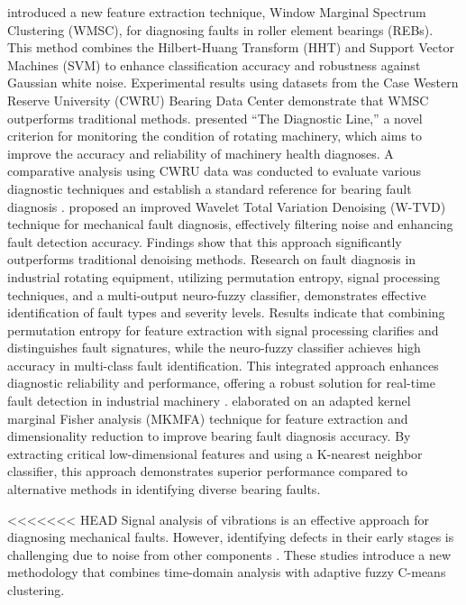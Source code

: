 \documentclass[sn-basic,pdflatex]{sn-jnl}
\theoremstyle{remark}
\theoremstyle{definition}
\begin{document}
\citet{WOS:000365686400021} introduced a new feature extraction
technique, Window Marginal Spectrum Clustering (WMSC), for diagnosing
faults in roller element bearings (REBs). This method combines the
Hilbert-Huang Transform (HHT) and Support Vector Machines (SVM) to
enhance classification accuracy and robustness against Gaussian white
noise. Experimental results using datasets from the Case Western Reserve
University (CWRU) Bearing Data Center demonstrate that WMSC outperforms
traditional methods. \citet{WOS:000366534900022} presented ``The
Diagnostic Line,'' a novel criterion for monitoring the condition of
rotating machinery, which aims to improve the accuracy and reliability
of machinery health diagnoses. A comparative analysis using CWRU data
was conducted to evaluate various diagnostic techniques and establish a
standard reference for bearing fault diagnosis
\citep{WOS:000357230900007}. \citet{WOS:000385104500001} proposed an
improved Wavelet Total Variation Denoising (W-TVD) technique for
mechanical fault diagnosis, effectively filtering noise and enhancing
fault detection accuracy. Findings show that this approach significantly
outperforms traditional denoising methods. Research on fault diagnosis
in industrial rotating equipment, utilizing permutation entropy, signal
processing techniques, and a multi-output neuro-fuzzy classifier,
demonstrates effective identification of fault types and severity
levels. Results indicate that combining permutation entropy for feature
extraction with signal processing clarifies and distinguishes fault
signatures, while the neuro-fuzzy classifier achieves high accuracy in
multi-class fault identification. This integrated approach enhances
diagnostic reliability and performance, offering a robust solution for
real-time fault detection in industrial machinery \citep{Rajabi2022}.
\citet{WOS:000392016300001} elaborated on an adapted kernel marginal
Fisher analysis (MKMFA) technique for feature extraction and
dimensionality reduction to improve bearing fault diagnosis accuracy. By
extracting critical low-dimensional features and using a K-nearest
neighbor classifier, this approach demonstrates superior performance
compared to alternative methods in identifying diverse bearing faults.

<<<<<<< HEAD
Signal analysis of vibrations is an effective approach for diagnosing
mechanical faults. However, identifying defects in their early stages is
challenging due to noise from other components
\citep{WOS:000369301600001, WOS:000367992900001}. These studies
introduce a new methodology that combines time-domain analysis with
adaptive fuzzy C-means clustering.
\end{document}
